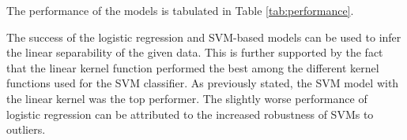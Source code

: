 \documentclass[10pt,twocolumn,letterpaper]{article}
\begin{document}
The performance of the models is tabulated in Table \ref{tab:performance}.

\begin{table}[htbp]
\caption{Training and Testing Scores for Different Models}
\label{tab:performance}
\end{table}

The success of the logistic regression and SVM-based models can be used to infer the linear separability of the given data. This is further supported by the fact that the linear kernel function performed the best among the different kernel functions used for the SVM classifier. As previously stated, the SVM model with the linear kernel was the top performer. The slightly worse performance of logistic regression can be attributed to the increased robustness of SVMs to outliers.
\end{document}

